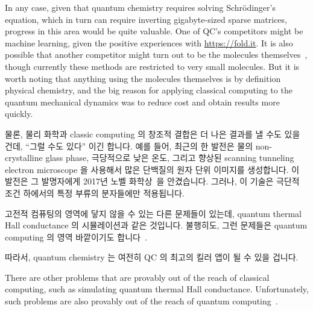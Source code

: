 In any case, given that quantum chemistry requires solving
Schr\"{o}dinger's equation, which in turn can require inverting
gigabyte-sized sparse matrices, progress in this area would
be quite valuable.
One of QC's competitors might be machine learning, given the positive
experiences with \url{https://fold.it}.
It is also possible that another competitor might turn out to be the
molecules themselves~\cite{Chin-wenChou2017ManipulateMolecule}, though
currently these methods are restricted to very small molecules.
But it is worth noting that anything using the molecules themselves
is by definition physical chemistry, and the big reason for applying
classical computing to the quantum mechanical dynamics was to reduce
cost and obtain results more quickly.
\fi

물론, 물리 화학과 classic computing 의 창조적 결합은 더 나은
결과를 낼 수도 있을 건데, ``그럴 수도 있다'' 이긴 합니다.
예를 들어, 최근의 한 발전은 물의 non-crystalline glass phase, 극당적으로 낮은
온도, 그리고 향상된 scanning tunneling electron microscope 을 사용해서 많은
단백질의 원자 단위 이미지를 생성합니다.
이 발전은 그 발명자에게 2017년 노벨
화학상~\cite{NobelPrizeChemistry2017,JohnTimmer2017ChemistryNobel}을
안겼습니다.
그러나, 이 기술은 극단적 조건 하에서의 특정 부류의 분자들에만 적용됩니다.

고전적 컴퓨팅의 영역에 닿지 않을 수 있는 다른 문제들이 있는데, quantum thermal
Hall conductance 의 시뮬레이션과 같은 것입니다.
불행히도, 그런 문제들은 quantum computing 의 영역 바깥이기도
합니다~\cite{ZoharRingel2017QuantizedGravityHall,RichardChirwin2017ThermalHallConductance}.

따라서, quantum chemistry 는 여전히 QC 의 최고의 킬러 앱이 될 수 있을 겁니다.
\iffalse

There are other problems that are provably out of the reach of
classical computing, such as simulating quantum thermal Hall conductance.
Unfortunately, such problems are also provably out of the reach of
quantum computing~\cite{ZoharRingel2017QuantizedGravityHall,RichardChirwin2017ThermalHallConductance}.

